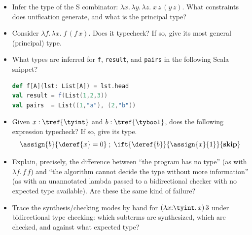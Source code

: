 \begin{itemize}
  \item Infer the type of the S combinator: $\lambda x.\,\lambda y.\,\lambda z.\; x\,z\,(y\,z)$. What constraints does unification generate, and what is the principal type?

  \item Consider $\lambda f.\,\lambda x.\; f\,(f\,x)$. Does it typecheck? If so, give its most general (principal) type.

  \item What types are inferred for \lstinline|f|, \lstinline|result|, and \lstinline|pairs| in the following Scala snippet?
\begin{lstlisting}[language=Scala]
def f[A](lst: List[A]) = lst.head
val result = f(List(1,2,3))
val pairs  = List((1,"a"), (2,"b"))
\end{lstlisting}

  \item Given $x : \tref{\tyint}$ and $b : \tref{\tybool}$, does the following expression typecheck? If so, give its type.
\[
  \assign{b}{\deref{x}=0}\;;\;\ift{\deref{b}}{\assign{x}{1}}{\mathbf{skip}}
\]

  \item Explain, precisely, the difference between ``the program has no type'' (as with $\lambda f.\,f\,f$) and ``the algorithm cannot decide the type without more information'' (as with an unannotated lambda passed to a bidirectional checker with no expected type available). Are these the same kind of failure?

  \item Trace the synthesis/checking modes by hand for $(\lambda x{:}\tyint.\,x)\,3$ under bidirectional type checking: which subterms are synthesized, which are checked, and against what expected type?
\end{itemize}
